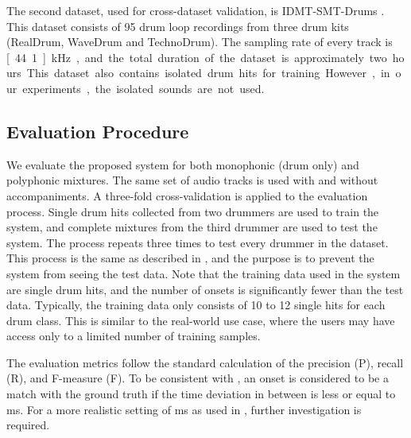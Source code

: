 \documentclass{article}
\begin{document}
The second dataset, used for cross-dataset validation, is IDMT-SMT-Drums \cite{Dittmar2014}. This dataset consists of 95 drum loop recordings from three drum kits (RealDrum, WaveDrum and TechnoDrum). The sampling rate of every track is \unit[44.1]{kHz}, and the total duration of the dataset is approximately two hours. This dataset also contains isolated drum hits for training. However, in our experiments, the isolated sounds are not used.   

\subsection{Evaluation Procedure}\label{subsec:evaluation procedure}
We evaluate the proposed system for both monophonic (drum only) and polyphonic mixtures. The same set of audio tracks is used with and without accompaniments. A three-fold cross-validation is applied to the evaluation process. Single drum hits collected from two drummers are used to train the system, and complete mixtures from the third drummer are used to test the system. The process repeats three times to test every drummer in the dataset. This process is the same as described in \cite{Paulus2009a}, and the purpose is to prevent the system from seeing the test data. Note that the training data used in the system are single drum hits, and the number of onsets is significantly fewer than the test data. Typically, the training data only consists of 10 to 12 single hits for each drum class. This is similar to the real-world use case, where the users may have access only to a limited number of training samples. 

The evaluation metrics follow the standard calculation of the precision (P), recall (R), and F-measure (F). To be consistent with \cite{gillet_transcription_2008}, an onset is considered to be a match with the ground truth if the time deviation in between is less or equal to \unit[50]{ms}. For a more realistic setting of \unit[30]{ms} as used in \cite{Paulus2009a}, further investigation is required. 
\end{document}
